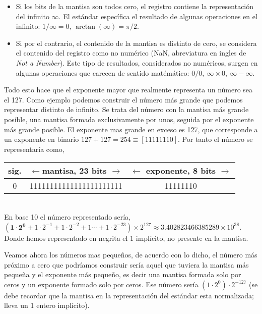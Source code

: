 \begin{itemize}
\item Si los bits de la mantisa son todos cero, el registro contiene la representación del infinito $\infty$.  El estándar específica el resultado de algunas operaciones en el infinito: $1/\infty=0$, $\arctan(\infty)=\pi/2$. 

\item {}  Si por el contrario, el contenido de la mantisa es distinto de cero, se considera el contenido del registro como no numérico (NaN, abreviatura en ingles de \emph{Not a Number}). Este tipo de resultados, considerados no numéricos, surgen en algunas operaciones que carecen de sentido matémático: $0/0, \ \infty\times0,\ \infty -\infty$.  

\end{itemize}

Todo esto hace que el exponente mayor que realmente representa un número sea el 127.  Como ejemplo podemos construir el número más grande que podemos representar distinto de infinito. Se trata del número con la mantisa más grande posible, una mantisa formada exclusivamente por unos, seguida por el exponente más grande posible. El exponente mas grande en exceso es 127, que corresponde a un exponente en binario $127+127=254 \equiv [11111110]$. Por tanto el número se representaría como,

\begin{tabular}{|c||c||c|}
\hline
sig.&$\leftarrow$mantisa, 23 bits $\rightarrow$&$\leftarrow$ exponente, 8 bits $\rightarrow$\\
\hline
0&11111111111111111111111&11111110\\
\hline
\end{tabular}\\

En base 10 el número representado sería, $(\mathbf{1\cdot2^0}+1\cdot2^{-1}+1\cdot2^{-2}+1\cdots+1\cdot2^{-23})\times2^{127}\approx 3.402823466385289\times10^{38}$. Donde hemos representado en negrita el 1 implícito, no presente en la mantisa.
 
Veamos ahora los números mas pequeños, de acuerdo con lo dicho, el número más próximo a cero que podríamos construir sería aquel que tuviera la mantisa más pequeña y el exponente más pequeño, es decir una mantisa formada solo por ceros y un exponente formado solo por ceros. Ese número sería $(1\cdot 2^0)\cdot2^{-127}$ (se debe recordar que la mantisa en la representación del estándar esta normalizada; lleva un 1 entero implícito). 

